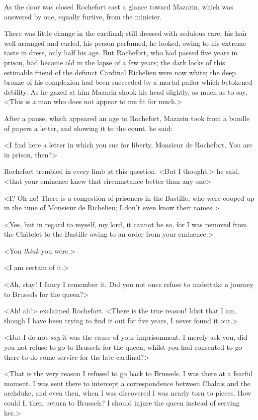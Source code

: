 As the door was closed Rochefort cast a glance toward Mazarin, which was answered by one, equally furtive, from the minister.

There was little change in the cardinal; still dressed with sedulous care, his hair well arranged and curled, his person perfumed, he looked, owing to his extreme taste in dress, only half his age. But Rochefort, who had passed five years in prison, had become old in the lapse of a few years; the dark locks of this estimable friend of the defunct Cardinal Richelieu were now white; the deep bronze of his complexion had been succeeded by a mortal pallor which betokened debility. As he gazed at him Mazarin shook his head slightly, as much as to say, <This is a man who does not appear to me fit for much.>

After a pause, which appeared an age to Rochefort, Mazarin took from a bundle of papers a letter, and showing it to the count, he said:

<I find here a letter in which you sue for liberty, Monsieur de Rochefort. You are in prison, then?>

Rochefort trembled in every limb at this question. <But I thought,> he said, <that your eminence knew that circumstance better than any one\longdash>

<I? Oh no! There is a congestion of prisoners in the Bastille, who were cooped up in the time of Monsieur de Richelieu; I don't even know their names.>

<Yes, but in regard to myself, my lord, it cannot be so, for I was removed from the Châtelet to the Bastille owing to an order from your eminence.>

<You \textit{think} you were.>

<I am certain of it.>

<Ah, stay! I fancy I remember it. Did you not once refuse to undertake a journey to Brussels for the queen?>

<Ah! ah!> exclaimed Rochefort. <There is the true reason! Idiot that I am, though I have been trying to find it out for five years, I never found it out.>

<But I do not \textit{say} it was the cause of your imprisonment. I merely ask you, did you not refuse to go to Brussels for the queen, whilst you had consented to go there to do some service for the late cardinal?>

<That is the very reason I refused to go back to Brussels. I was there at a fearful moment. I was sent there to intercept a correspondence between Chalais and the archduke, and even then, when I was discovered I was nearly torn to pieces. How could I, then, return to Brussels? I should injure the queen instead of serving her.>

